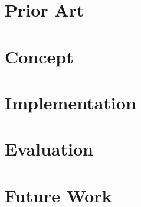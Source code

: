 \chapter{Prior Art}


\chapter{Concept}


\chapter{Implementation}


\chapter{Evaluation}


\chapter{Future Work}


\nocite{*}
